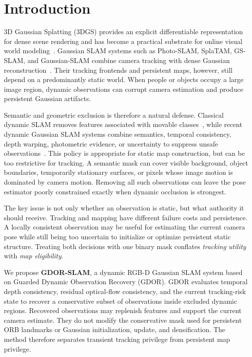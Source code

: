 \section{Introduction}

3D Gaussian Splatting (3DGS) provides an explicit differentiable representation for dense scene rendering and has become a practical substrate for online visual world modeling~\cite{kerbl20233dgaussian}.
Gaussian SLAM systems such as Photo-SLAM, SplaTAM, GS-SLAM, and Gaussian-SLAM combine camera tracking with dense Gaussian reconstruction~\cite{huai2024photoSLAM,keetha2024splatam,yan2023gs,yugay2023gaussianslam}.
Their tracking frontends and persistent maps, however, still depend on a predominantly static world.
When people or objects occupy a large image region, dynamic observations can corrupt camera estimation and produce persistent Gaussian artifacts.

Semantic and geometric exclusion is therefore a natural defense.
Classical dynamic SLAM removes features associated with movable classes~\cite{bescos2018dynaslam,yu2018ds,xiao2019dynamic}, while recent dynamic Gaussian SLAM systems combine semantics, temporal consistency, depth warping, photometric evidence, or uncertainty to suppress unsafe observations~\cite{xu2024dgslam,kong2024dgsslam,liu2025dyphoslam,zhang2026dagsslam}.
This policy is appropriate for static map construction, but can be too restrictive for tracking.
A semantic mask can cover visible background, object boundaries, temporarily stationary surfaces, or pixels whose image motion is dominated by camera motion.
Removing all such observations can leave the pose estimator poorly constrained exactly when dynamic occlusion is strongest.

The key issue is not only whether an observation is static, but what authority it should receive.
Tracking and mapping have different failure costs and persistence.
A locally consistent observation may be useful for estimating the current camera pose while still being too uncertain to initialize or optimize persistent static structure.
Treating both decisions with one binary mask conflates \emph{tracking utility} with \emph{map eligibility}.

We propose \textbf{GDOR-SLAM}, a dynamic RGB-D Gaussian SLAM system based on Guarded Dynamic Observation Recovery (GDOR).
GDOR evaluates temporal depth consistency, residual optical-flow consistency, and the current tracking-risk state to recover a conservative subset of observations inside excluded dynamic regions.
Recovered observations may replenish features and support the current camera estimate.
They do not modify the conservative mask used for persistent ORB landmarks or Gaussian initialization, update, and densification.
The method therefore separates transient tracking privilege from persistent map privilege.

